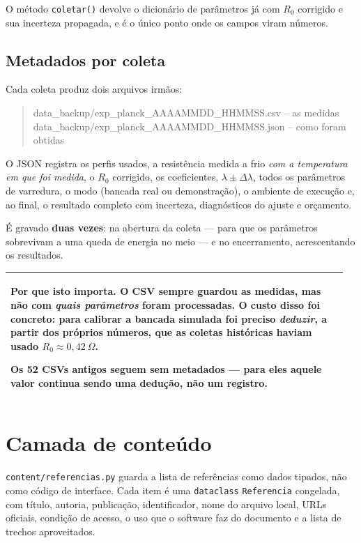 \documentclass[11pt,a4paper]{article}
\newcommand{\arqv}[1]{\texttt{#1}}
\newcommand{\classe}[1]{\texttt{#1}}
\newenvironment{nota}
  {\par\medskip\noindent\begin{tabular}{|p{0.96\linewidth}|}\hline\rule{0pt}{3ex}}
  {\\[1ex]\hline\end{tabular}\par\medskip}
\begin{document}
O método \texttt{coletar()} devolve o dicionário de parâmetros já com $R_0$
corrigido e sua incerteza propagada, e é o único ponto onde os campos viram
números.

\subsection{Metadados por coleta}

Cada coleta produz dois arquivos irmãos:

\begin{quote}\ttfamily
data\_backup/exp\_planck\_AAAAMMDD\_HHMMSS.csv \quad -- as medidas\\
data\_backup/exp\_planck\_AAAAMMDD\_HHMMSS.json \quad -- como foram obtidas
\end{quote}

O JSON registra os perfis usados, a resistência medida a frio \emph{com a
temperatura em que foi medida}, o $R_0$ corrigido, os coeficientes,
$\lambda \pm \Delta\lambda$, todos os parâmetros de varredura, o modo (bancada
real ou demonstração), o ambiente de execução e, ao final, o resultado completo
com incerteza, diagnósticos do ajuste e orçamento.

É gravado \textbf{duas vezes}: na abertura da coleta --- para que os parâmetros
sobrevivam a uma queda de energia no meio --- e no encerramento, acrescentando
os resultados.

\begin{nota}
\textbf{Por que isto importa.} O CSV sempre guardou as medidas, mas não com
\emph{quais parâmetros} foram processadas. O custo disso foi concreto: para
calibrar a bancada simulada foi preciso \emph{deduzir}, a partir dos próprios
números, que as coletas históricas haviam usado $R_0 \approx 0{,}42~\Omega$.

Os 52 CSVs antigos seguem sem metadados --- para eles aquele valor continua
sendo uma dedução, não um registro.
\end{nota}

\section{Camada de conteúdo}

\arqv{content/referencias.py} guarda a lista de referências como dados tipados,
não como código de interface. Cada item é uma \texttt{dataclass}
\classe{Referencia} congelada, com título, autoria, publicação, identificador,
nome do arquivo local, URLs oficiais, condição de acesso, o uso que o software
faz do documento e a lista de trechos aproveitados.
\end{document}
